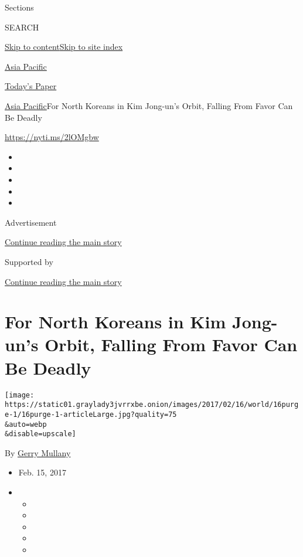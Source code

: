 Sections

SEARCH

\protect\hyperlink{site-content}{Skip to
content}\protect\hyperlink{site-index}{Skip to site index}

\href{https://www.nytimes3xbfgragh.onion/section/world/asia}{Asia
Pacific}

\href{https://myaccount.nytimes3xbfgragh.onion/auth/login?response_type=cookie\&client_id=vi}{}

\href{https://www.nytimes3xbfgragh.onion/section/todayspaper}{Today's
Paper}

\href{/section/world/asia}{Asia Pacific}\textbar{}For North Koreans in
Kim Jong-un's Orbit, Falling From Favor Can Be Deadly

\url{https://nyti.ms/2lOMgbw}

\begin{itemize}
\item
\item
\item
\item
\item
\end{itemize}

Advertisement

\protect\hyperlink{after-top}{Continue reading the main story}

Supported by

\protect\hyperlink{after-sponsor}{Continue reading the main story}

\hypertarget{for-north-koreans-in-kim-jong-uns-orbit-falling-from-favor-can-be-deadly}{%
\section{For North Koreans in Kim Jong-un's Orbit, Falling From Favor
Can Be
Deadly}\label{for-north-koreans-in-kim-jong-uns-orbit-falling-from-favor-can-be-deadly}}

\texttt{[image: https://static01.graylady3jvrrxbe.onion/images/2017/02/16/world/16purge-1/16purge-1-articleLarge.jpg?quality=75\\\&auto=webp\\\&disable=upscale]}

By \href{http://www.nytimes3xbfgragh.onion/by/gerry-mullany}{Gerry
Mullany}

\begin{itemize}
\item
  Feb. 15, 2017
\item
  \begin{itemize}
  \item
  \item
  \item
  \item
  \item
  \end{itemize}
\end{itemize}

